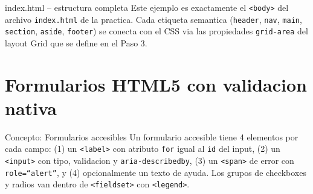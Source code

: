 \documentclass[11pt,a4paper]{article}
\begin{document}
	\begin{cajapractica}{index.html -- estructura completa}
		Este ejemplo es exactamente el \texttt{<body>} del archivo \texttt{index.html} de la practica. Cada etiqueta semantica (\texttt{header}, \texttt{nav}, \texttt{main}, \texttt{section}, \texttt{aside}, \texttt{footer}) se conecta con el CSS via las propiedades \texttt{grid-area} del layout Grid que se define en el Paso 3.
	\end{cajapractica}
	
	\section{Formularios HTML5 con validacion nativa}
	
	\begin{cajaconcepto}{Concepto: Formularios accesibles}
		Un formulario accesible tiene 4 elementos por cada campo: (1) un \texttt{<label>} con atributo \texttt{for} igual al \texttt{id} del input, (2) un \texttt{<input>} con tipo, validacion y \texttt{aria-describedby}, (3) un \texttt{<span>} de error con \texttt{role=``alert''}, y (4) opcionalmente un texto de ayuda. Los grupos de checkboxes y radios van dentro de \texttt{<fieldset>} con \texttt{<legend>}.
	\end{cajaconcepto}
	
\end{document}
